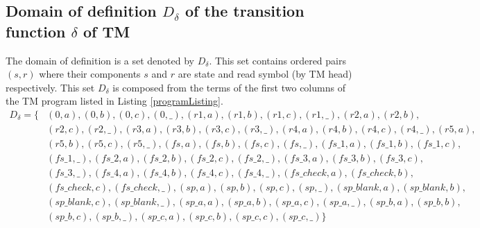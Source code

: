 \documentclass[12pt, a4paper]{report}
\begin{document}
	\subsection{Domain of definition $ D_{\delta} $ of the transition function $ \delta $ of TM}
	The domain of definition is a set denoted by $ D_{\delta} $. This set contains ordered pairs $ (s, r) $ where  their components $ s $ and $ r $ are state and read symbol (by TM head) respectively. This set $ D_{\delta} $ is composed from the terms of the first two columns of the TM program listed in Listing \ref{programListing}.
	\begin{equation}
	\begin{aligned}
	\label{eq:domain}
		D_{\delta} = \{
		& (0, a), (0, b), (0, c), (0, \_), (r1, a), (r1, b), (r1, c), (r1, \_), (r2, a), (r2, b), \\
		& (r2, c), (r2, \_), (r3, a), (r3, b), (r3, c), (r3, \_), (r4, a), (r4, b), (r4, c), (r4, \_), (r5, a), \\
		& (r5, b), (r5, c), (r5, \_), (fs, a), (fs, b), (fs, c), (fs, \_), (fs\_1, a), (fs\_1, b), (fs\_1, c), \\
		& (fs\_1, \_), (fs\_2, a), (fs\_2, b), (fs\_2, c), (fs\_2, \_), (fs\_3, a), (fs\_3, b), (fs\_3, c), \\
		& (fs\_3, \_), (fs\_4, a), (fs\_4, b), (fs\_4, c), (fs\_4, \_), (fs\_check, a), (fs\_check, b), \\
		& (fs\_check, c), (fs\_check, \_), (sp, a), (sp, b), (sp, c), (sp, \_), (sp\_blank, a), (sp\_blank, b),\\
		& (sp\_blank, c), (sp\_blank, \_), (sp\_a, a), (sp\_a, b), (sp\_a, c), (sp\_a, \_), (sp\_b, a), (sp\_b, b), \\
		& (sp\_b, c), (sp\_b, \_), (sp\_c, a), (sp\_c, b), (sp\_c, c), (sp\_c, \_) \}
	\end{aligned}
	\end{equation}
\end{document}
